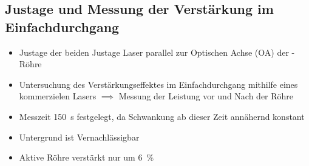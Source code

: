 \documentclass[10pt, aspectratio=169]{beamer}
\newcommand{\hne}{\ce{HeNe}}
\begin{document}
\subsection{Justage und Messung der Verst\"arkung im Einfachdurchgang}
\begin{frame}
  \begin{itemize}
  \item<1-> Justage der beiden Justage Laser parallel zur Optischen
    Achse (OA) der \hne{}-R\"ohre 
  \item<2-> Untersuchung des Verst\"arkungseffektes im
    Einfachdurchgang mithilfe eines kommerzielen \hne{} Lasers
    \(\implies\) Messung der Leistung vor und Nach der R\"ohre
  \item<3-> Messzeit \SI{150}{\second} festgelegt, da Schwankung ab
    dieser Zeit annähernd konstant
  \end{itemize}

  \begin{itemize}
  \item<5-> Untergrund ist Vernachl\"assigbar
  \item<6-> Aktive R\"ohre verst\"arkt nur um \SI{6}{\percent}
  \end{itemize}
\end{frame}
\end{document}
